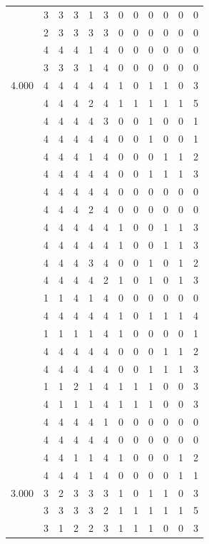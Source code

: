\documentclass[]{book}
\theoremstyle{definition}
\theoremstyle{definition}
\theoremstyle{definition}
\theoremstyle{remark}
\begin{document}
\begin{table}
{\begin{tabular}[t]{rrrrrrrrrrrr}
 & 3 & 3 & 3 & 1 & 3 & 0 & 0 & 0 & 0 & 0 & 0\\
 & 2 & 3 & 3 & 3 & 3 & 0 & 0 & 0 & 0 & 0 & 0\\
 & 4 & 4 & 4 & 1 & 4 & 0 & 0 & 0 & 0 & 0 & 0\\
 & 3 & 3 & 3 & 1 & 4 & 0 & 0 & 0 & 0 & 0 & 0\\
4.000 & 4 & 4 & 4 & 4 & 4 & 1 & 0 & 1 & 1 & 0 & 3\\
 & 4 & 4 & 4 & 2 & 4 & 1 & 1 & 1 & 1 & 1 & 5\\
 & 4 & 4 & 4 & 4 & 3 & 0 & 0 & 1 & 0 & 0 & 1\\
 & 4 & 4 & 4 & 4 & 4 & 0 & 0 & 1 & 0 & 0 & 1\\
 & 4 & 4 & 4 & 1 & 4 & 0 & 0 & 0 & 1 & 1 & 2\\
 & 4 & 4 & 4 & 4 & 4 & 0 & 0 & 1 & 1 & 1 & 3\\
 & 4 & 4 & 4 & 4 & 4 & 0 & 0 & 0 & 0 & 0 & 0\\
 & 4 & 4 & 4 & 2 & 4 & 0 & 0 & 0 & 0 & 0 & 0\\
 & 4 & 4 & 4 & 4 & 4 & 1 & 0 & 0 & 1 & 1 & 3\\
 & 4 & 4 & 4 & 4 & 4 & 1 & 0 & 0 & 1 & 1 & 3\\
 & 4 & 4 & 4 & 3 & 4 & 0 & 0 & 1 & 0 & 1 & 2\\
 & 4 & 4 & 4 & 4 & 2 & 1 & 0 & 1 & 0 & 1 & 3\\
 & 1 & 1 & 4 & 1 & 4 & 0 & 0 & 0 & 0 & 0 & 0\\
 & 4 & 4 & 4 & 4 & 4 & 1 & 0 & 1 & 1 & 1 & 4\\
 & 1 & 1 & 1 & 1 & 4 & 1 & 0 & 0 & 0 & 0 & 1\\
 & 4 & 4 & 4 & 4 & 4 & 0 & 0 & 0 & 1 & 1 & 2\\
 & 4 & 4 & 4 & 4 & 4 & 0 & 0 & 1 & 1 & 1 & 3\\
 & 1 & 1 & 2 & 1 & 4 & 1 & 1 & 1 & 0 & 0 & 3\\
 & 4 & 1 & 1 & 1 & 4 & 1 & 1 & 1 & 0 & 0 & 3\\
 & 4 & 4 & 4 & 4 & 1 & 0 & 0 & 0 & 0 & 0 & 0\\
 & 4 & 4 & 4 & 4 & 4 & 0 & 0 & 0 & 0 & 0 & 0\\
 & 4 & 4 & 1 & 1 & 4 & 1 & 0 & 0 & 0 & 1 & 2\\
 & 4 & 4 & 4 & 1 & 4 & 0 & 0 & 0 & 0 & 1 & 1\\
3.000 & 3 & 2 & 3 & 3 & 3 & 1 & 0 & 1 & 1 & 0 & 3\\
 & 3 & 3 & 3 & 3 & 2 & 1 & 1 & 1 & 1 & 1 & 5\\
 & 3 & 1 & 2 & 2 & 3 & 1 & 1 & 1 & 0 & 0 & 3\\

\end{tabular}}
\end{table}
\end{document}
